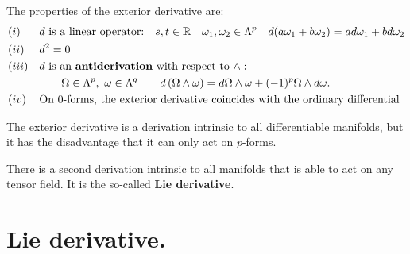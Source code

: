 \begin{points}
\item The properties of the exterior derivative are:
\begin{align*}
  &(i)&&d\text{ is a linear operator:}\quad s,t\in\mathbb{R}\quad\omega_1,\omega_2\in\Lambda^p\quad d(a\omega_1+b\omega_2)=ad\omega_1+bd\omega_2\\
  &(ii)&&d^2=0\\
  &(iii)&&d\text{ is an \textbf{antiderivation} with respect to }\wedge:\\
  &&&\qquad\Omega\in\Lambda^p,\ \omega\in\Lambda^q\qquad d\left(\Omega\wedge\omega\right)=d\Omega\wedge\omega+(-1)^p\Omega\wedge d\omega.\\
  &(iv)&&\text{On 0-forms, the exterior derivative coincides with the ordinary differential}
\end{align*}

\item The exterior derivative is a derivation intrinsic to all differentiable manifolds, but it has the disadvantage that it can only act on $p$-forms.

\item There is a second derivation intrinsic to all manifolds that is able to act on any tensor field. It is the so-called \textbf{Lie derivative}.
\end{points}

\section{Lie derivative.}

